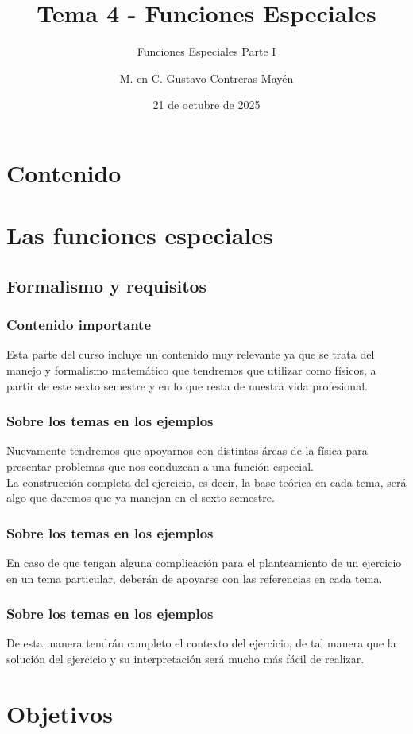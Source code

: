 \documentclass[12pt]{beamer}
\date{21 de octubre de 2025}
\title{\large{Tema 4 - Funciones Especiales}}
\subtitle{Funciones Especiales Parte I}
\author{M. en C. Gustavo Contreras Mayén}
\begin{document}
\maketitle
\fontsize{14}{14}\selectfont
{}

\section*{Contenido}

\section{Las funciones especiales}
\subsection{Formalismo y requisitos}

\begin{frame}
\frametitle{Contenido importante}
Esta parte del curso incluye un contenido muy relevante ya que se trata del manejo y formalismo matemático que tendremos que utilizar como físicos, a partir de este sexto semestre y en lo que resta de nuestra vida profesional.
\end{frame}
\begin{frame}
\frametitle{Sobre los temas en los ejemplos}
Nuevamente tendremos que apoyarnos con distintas áreas de la física para presentar problemas que nos conduzcan a una función especial.
\\
\bigskip
\pause
La construcción completa del ejercicio, es decir, la base teórica en cada tema, será algo que daremos que ya manejan en el sexto semestre.
\end{frame}
\begin{frame}
\frametitle{Sobre los temas en los ejemplos}
En caso de que tengan alguna complicación para el planteamiento de un ejercicio en un tema particular, deberán de apoyarse con las referencias en cada tema.
\end{frame}
\begin{frame}
\frametitle{Sobre los temas en los ejemplos}
De esta manera tendrán completo el contexto del ejercicio, de tal manera que la solución del ejercicio y su interpretación será mucho más fácil de realizar.
\end{frame}

\section{Objetivos}
\end{document}
